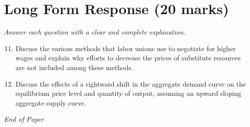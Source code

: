 \documentclass[12pt]{article}
\begin{document}
\section*{Long Form Response (20 marks)}
\textit{Answer each question with a clear and complete explanation.}
\begin{enumerate}[label=\arabic*.]
\setcounter{enumi}{10}
\item Discuss the various methods that labor unions use to negotiate for higher wages and explain why efforts to decrease the prices of substitute resources are not included among these methods.
\item Discuss the effects of a rightward shift in the aggregate demand curve on the equilibrium price level and quantity of output, assuming an upward sloping aggregate supply curve.
\end{enumerate}

\vfill
\noindent\textit{End of Paper}
\end{document}
